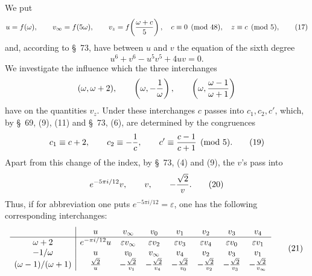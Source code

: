 \documentclass[11pt]{article}
\begin{document}
We put
\begin{equation}
 u=f(\omega),\qquad v_\infty=f(5\omega),\qquad
 v_z=f\!\left({\omega+c\over5}\right),
\quad c\equiv0\pmod{48},\quad z\equiv c\pmod5,
\tag{17}
\end{equation}
and, according to \S~73, have between \(u\) and \(v\) the equation of the sixth degree
\begin{equation}
 u^6+v^6-u^5v^5+4uv=0.
\tag{18}
\end{equation}
We investigate the influence which the three interchanges
\[
(\omega,\omega+2),\qquad
\left(\omega,-{1\over\omega}\right),\qquad
\left(\omega,{\omega-1\over\omega+1}\right)
\]
have on the quantities \(v_z\). Under these interchanges \(c\) passes into \(c_1,c_2,c'\), which, by \S~69, (9), (11) and \S~73, (6), are determined by the congruences
\begin{equation}
 c_1\equiv c+2,\qquad c_2\equiv-{1\over c},\qquad
 c'\equiv {c-1\over c+1}\pmod5.
\tag{19}
\end{equation}
Apart from this change of the index, by \S~73, (4) and (9), the \(v\)'s pass into
\begin{equation}
 e^{-5\pi i/12}v,\qquad v,\qquad -{\sqrt2\over v}.
\tag{20}
\end{equation}
Thus, if for abbreviation one puts \(e^{-5\pi i/12}=\varepsilon\), one has the following corresponding interchanges:
\begin{equation}
\begin{array}{c|ccccccc}
&u&v_\infty&v_0&v_1&v_2&v_3&v_4\\ \hline
\omega+2&
 e^{-\pi i/12}u&\varepsilon v_\infty&\varepsilon v_2&\varepsilon v_3&\varepsilon v_4&\varepsilon v_0&\varepsilon v_1\\
-1/\omega&
 u&v_0&v_\infty&v_4&v_2&v_3&v_1\\
(\omega-1)/(\omega+1)&
 {\sqrt2\over u}&-{\sqrt2\over v_1}&-{\sqrt2\over v_4}&-{\sqrt2\over v_0}
 &-{\sqrt2\over v_2}&-{\sqrt2\over v_3}&-{\sqrt2\over v_\infty}
\end{array}
\tag{21}
\end{equation}
\end{document}
